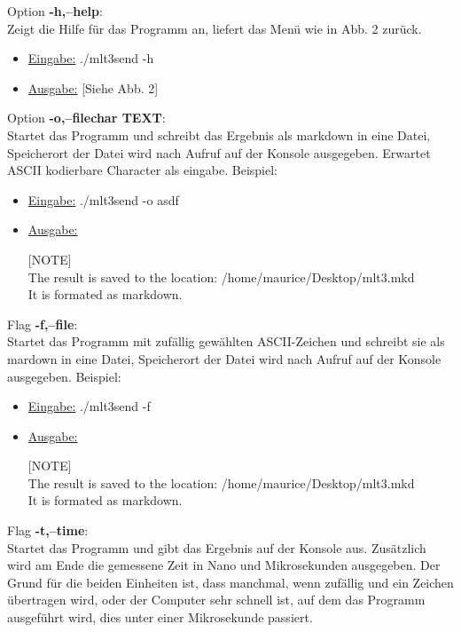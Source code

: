 \documentclass{article}
\begin{document}
Option \textbf{-h,--help}:\\
Zeigt die Hilfe für das Programm an, liefert das Menü wie in Abb. 2 zurück.
\begin{itemize}
	\item \underline{Eingabe:} ./mlt3send -h
	\item \underline{Ausgabe:} [Siehe Abb. 2]\\
\end{itemize}

Option \textbf{-o,--filechar TEXT}:\\
Startet das Programm und schreibt das Ergebnis als markdown in eine Datei, Speicherort der Datei wird nach Aufruf auf der Konsole ausgegeben.
Erwartet ASCII kodierbare Character als eingabe.
Beispiel: 
\begin{itemize}
	\item \underline{Eingabe:} ./mlt3send -o asdf
	\item \underline{Ausgabe:}

[NOTE]\\
The result is saved to the location: /home/maurice/Desktop/mlt3.mkd\\
It is formated as markdown.\\
\end{itemize}

Flag \textbf{-f,--file}:\\
Startet das Programm mit zufällig gewählten ASCII-Zeichen und schreibt sie als mardown in eine Datei, Speicherort der Datei wird nach Aufruf auf der Konsole ausgegeben.
Beispiel: 
\begin{itemize}
	\item \underline{Eingabe:} ./mlt3send -f
	\item \underline{Ausgabe:}

[NOTE]\\
The result is saved to the location: /home/maurice/Desktop/mlt3.mkd\\
It is formated as markdown.\\
\end{itemize}

Flag \textbf{-t,--time}:\\
Startet das Programm und gibt das Ergebnis auf der Konsole aus. Zusätzlich wird am Ende die gemessene Zeit in Nano und Mikrosekunden ausgegeben. Der Grund für die beiden
Einheiten ist, dass manchmal, wenn zufällig und ein Zeichen übertragen wird, oder der Computer sehr schnell ist, auf dem das Programm ausgeführt wird, dies unter
einer Mikrosekunde passiert.
\end{document}

